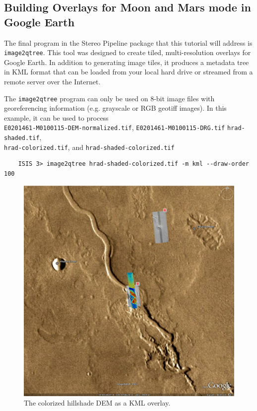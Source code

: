 \clearpage

\subsection{Building Overlays for Moon and Mars mode in Google Earth}

The final program in the Stereo Pipeline package that this tutorial
will address is \texttt{image2qtree}.  This tool was designed to
create tiled, multi-resolution overlays for Google Earth.  In addition
to generating image tiles, it produces a metadata tree in KML format
that can be loaded from your local hard drive or streamed from a
remote server over the Internet.

The \texttt{image2qtree} program can only be used on 8-bit image files
with georeferencing information (e.g. grayscale or RGB geotiff
images). In this example, it can be used to process \\
\texttt{E0201461-M0100115-DEM-normalized.tif},
\texttt{E0201461-M0100115-DRG.tif} \texttt{hrad-shaded.tif}, \\
\texttt{hrad-colorized.tif}, and \texttt{hrad-shaded-colorized.tif}

\begin{verbatim}
    ISIS 3> image2qtree hrad-shaded-colorized.tif -m kml --draw-order 100
\end{verbatim}

\begin{figure}[b!]
\begin{center}
\includegraphics[width=6in]{images/p19-googlemars.png}
\caption[Hrad shaded colorized DEM as a KML overlay] {
    \label{hrad-kml}
        The colorized hillshade DEM as a KML overlay.  }
\end{center}
\end{figure}
